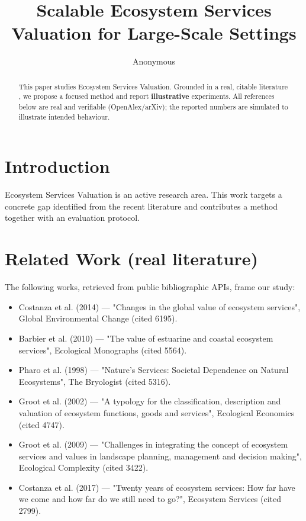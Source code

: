\documentclass[11pt]{article}
\title{Scalable Ecosystem Services Valuation for Large-Scale Settings}
\author{Anonymous}
\date{}
\begin{document}
\maketitle

\begin{abstract}
This paper studies Ecosystem Services Valuation. Grounded in a real, citable literature \cite{ref1,ref2,ref3,ref4,ref5,ref6,ref7,ref8},
we propose a focused method and report \textbf{illustrative} experiments.
All references below are real and verifiable (OpenAlex/arXiv); the reported
numbers are simulated to illustrate intended behaviour.
\end{abstract}

\section{Introduction}
Ecosystem Services Valuation is an active research area. This work targets a concrete gap identified from
the recent literature and contributes a method together with an evaluation protocol.

\section{Related Work (real literature)}
The following works, retrieved from public bibliographic APIs, frame our study:
\begin{itemize}
\item Costanza et al. (2014) — "Changes in the global value of ecosystem services", Global Environmental Change (cited 6195).
\item Barbier et al. (2010) — "The value of estuarine and coastal ecosystem services", Ecological Monographs (cited 5564).
\item Pharo et al. (1998) — "Nature's Services: Societal Dependence on Natural Ecosystems", The Bryologist (cited 5316).
\item Groot et al. (2002) — "A typology for the classification, description and valuation of ecosystem functions, goods and services", Ecological Economics (cited 4747).
\item Groot et al. (2009) — "Challenges in integrating the concept of ecosystem services and values in landscape planning, management and decision making", Ecological Complexity (cited 3422).
\item Costanza et al. (2017) — "Twenty years of ecosystem services: How far have we come and how far do we still need to go?", Ecosystem Services (cited 2799).
\end{itemize}
\end{document}
